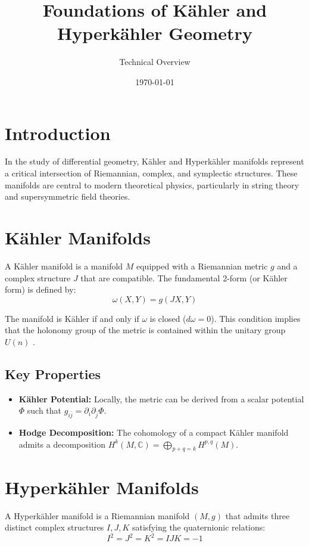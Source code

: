\documentclass[11pt]{article}
\title{Foundations of Kähler and Hyperkähler Geometry}
\author{Technical Overview}
\date{\today}
\begin{document}
\maketitle

\section{Introduction}
In the study of differential geometry, Kähler and Hyperkähler manifolds represent a critical intersection of Riemannian, complex, and symplectic structures. These manifolds are central to modern theoretical physics, particularly in string theory and supersymmetric field theories.

\section{Kähler Manifolds}
A Kähler manifold is a manifold $M$ equipped with a Riemannian metric $g$ and a complex structure $J$ that are compatible. The fundamental 2-form (or Kähler form) is defined by:
\begin{equation}
    \omega(X, Y) = g(JX, Y)
\end{equation}

The manifold is Kähler if and only if $\omega$ is closed ($d\omega = 0$). This condition implies that the holonomy group of the metric is contained within the unitary group $U(n)$ \cite{huybrechts}.

\subsection{Key Properties}
\begin{itemize}
    \item \textbf{Kähler Potential:} Locally, the metric can be derived from a scalar potential $\Phi$ such that $g_{i\bar{j}} = \partial_i \partial_{\bar{j}} \Phi$.
    \item \textbf{Hodge Decomposition:} The cohomology of a compact Kähler manifold admits a decomposition $H^k(M, \mathbb{C}) = \bigoplus_{p+q=k} H^{p,q}(M)$.
\end{itemize}

\section{Hyperkähler Manifolds}
A Hyperkähler manifold is a Riemannian manifold $(M, g)$ that admits three distinct complex structures $I, J, K$ satisfying the quaternionic relations:
\begin{equation}
    I^2 = J^2 = K^2 = IJK = -1
\end{equation}
\end{document}
